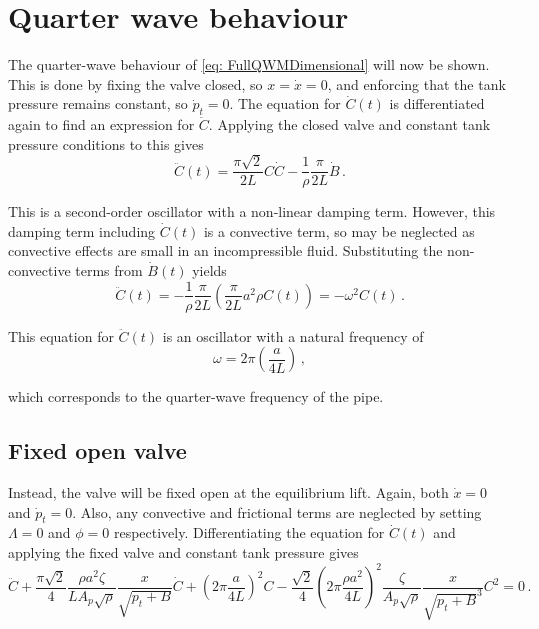 \section{Quarter wave behaviour} \label{sec: QWBehaviour}

The quarter-wave behaviour of \cref{eq: FullQWMDimensional} will now be shown.
This is done by fixing the valve closed, so $x = \dot{x} = 0$, and enforcing that the tank pressure remains constant, so $\dot{p}_t = 0$. The  equation for $\dot{C}(t)$ is differentiated again to find an expression for $\ddot{C}$. Applying the closed valve and constant tank pressure conditions to this gives
~
\begin{equation*}
    \ddot{C}(t) = \frac{\pi \sqrt{2}}{2 L} C \dot{C} - \frac{1}{\rho} \frac{\pi}{2 L} \dot{B} \, .
\end{equation*}

This is a second-order oscillator with a non-linear damping term. However, this damping term including $\dot{C}(t)$ is a convective term, so may be neglected as convective effects are small in an incompressible fluid. Substituting the non-convective terms from $\dot{B}(t)$ yields
~
\begin{equation*}
    \ddot{C}(t) = - \frac{1}{\rho} \frac{\pi}{2 L} \left( \frac{\pi}{2L} a^2 \rho C(t) \right) = - \omega^2 C(t) \, .
\end{equation*}

This equation for $\ddot{C}(t)$ is an oscillator with a natural frequency of
~
\begin{equation*}
    \omega = 2 \pi \left( \frac{a}{4 L} \right) \, ,
\end{equation*}

which corresponds to the quarter-wave frequency of the pipe.

\subsection{Fixed open valve}

Instead, the valve will be fixed open at the equilibrium lift. Again, both $\dot{x} = 0$ and $\dot{p}_t = 0$. Also, any convective and frictional terms are neglected by setting $\Lambda = 0$ and $\phi = 0$ respectively. Differentiating the equation for $\dot{C}(t)$ and applying the fixed valve and constant tank pressure gives
~
\begin{equation*}
    \ddot{C} + \frac{\pi \sqrt{2}}{4} \frac{\rho a^2 \zeta}{L A_p \sqrt{\rho}} \frac{x}{\sqrt{p_t + B}} \dot{C} +
    \left( 2 \pi \frac{a}{4 L} \right)^2 C -
    \frac{\sqrt{2}}{4} \left( 2 \pi \frac{\rho a^2}{4L} \right)^2 \frac{\zeta}{A_p \sqrt{\rho}} \frac{x}{\sqrt{p_t + B}^3} C^2 = 0 \, .
\end{equation*}

